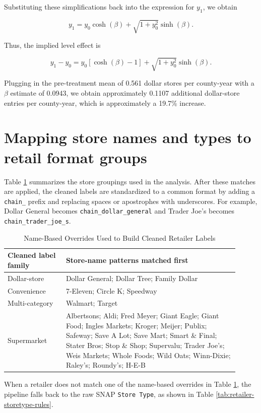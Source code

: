 \documentclass[12pt]{article}
\begin{document}
\begin{appendices}
Substituting these simplifications back into the expression for \(y_1\), we obtain

\[
y_1
=
y_0\cosh(\beta)
+
\sqrt{1+y_0^2}\sinh(\beta).
\]

Thus, the implied level effect is

\[
y_1-y_0
=
y_0\left[\cosh(\beta)-1\right]
+
\sqrt{1+y_0^2}\sinh(\beta).
\]

Plugging in the pre-treatment mean of 0.561 dollar stores per county-year with a \(\beta\) estimate of 0.0943, we obtain approximately 0.1107 additional dollar-store entries per county-year, which is approximately a 19.7\% increase.

\section{Mapping store names and types to retail format groups} \label{app:retail_groups}

Table \ref{tab:retailer-name-rules} summarizes the store groupings used in the analysis. After these matches are applied, the cleaned labels are standardized to a common format by adding a \texttt{chain\_} prefix and replacing spaces or apostrophes with underscores. For example, Dollar General becomes \texttt{chain\_dollar\_general} and Trader Joe's becomes \texttt{chain\_trader\_joe\_s}.


\begin{table}[!htbp]
\centering
\caption{Name-Based Overrides Used to Build Cleaned Retailer Labels}
\label{tab:retailer-name-rules}
\small
\begin{tabular}{p{0.23\linewidth}p{0.68\linewidth}}
\hline
Cleaned label family & Store-name patterns matched first \\
\hline
Dollar-store & Dollar General; Dollar Tree; Family Dollar \\
Convenience & 7-Eleven; Circle K; Speedway \\
Multi-category & Walmart; Target \\
Supermarket & Albertsons; Aldi; Fred Meyer; Giant Eagle; Giant Food; Ingles Markets; Kroger; Meijer; Publix; Safeway; Save A Lot; Save Mart; Smart \& Final; Stater Bros; Stop \& Shop; Supervalu; Trader Joe's; Weis Markets; Whole Foods; Wild Oats; Winn-Dixie; Raley's; Roundy's; H-E-B \\
\hline
\end{tabular}
\end{table}

When a retailer does not match one of the name-based overrides in Table \ref{tab:retailer-name-rules}, the pipeline falls back to the raw SNAP \texttt{Store Type}, as shown in Table \ref{tab:retailer-storetype-rules}.


\end{appendices}
\end{document}
